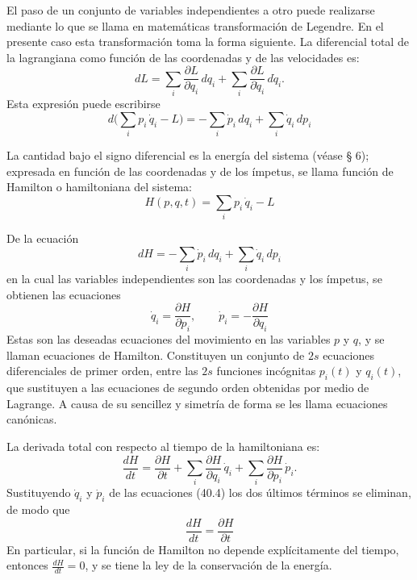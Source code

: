 \documentclass[12pt]{article}
\begin{document}
El paso de un conjunto de variables independientes a otro puede realizarse mediante lo que se llama en matemáticas transformación de Legendre. En el presente caso esta transformación toma la forma siguiente. La diferencial total de la lagrangiana como función de las coordenadas y de las velocidades es:
\[
dL
= \sum_i \frac{\partial L}{\partial q_i}\,dq_i
+ \sum_i \frac{\partial L}{\partial \dot q_i}\,d\dot q_i.
\]
Esta expresión puede escribirse
\begin{equation}
d\biggl(\sum_i p_i\,\dot q_i - L\biggr)
= -\sum_i \dot p_i\,dq_i
+ \sum_i \dot q_i\,dp_i
\tag{40.1}
\end{equation}

La cantidad bajo el signo diferencial es la energía del sistema (véase § 6); expresada en función de las coordenadas y de los ímpetus, se llama función de Hamilton o hamiltoniana del sistema:
\begin{equation}
H(p,q,t)
= \sum_i p_i\,\dot q_i - L
\tag{40.2}
\end{equation}

De la ecuación
\begin{equation}
dH
= -\sum_i \dot p_i\,dq_i
+ \sum_i \dot q_i\,dp_i
\tag{40.3}
\end{equation}
en la cual las variables independientes son las coordenadas y los ímpetus, se obtienen las ecuaciones
\begin{equation}
\dot q_i = \frac{\partial H}{\partial p_i},
\qquad
\dot p_i = -\frac{\partial H}{\partial q_i}
\tag{40.4}
\end{equation}
Estas son las deseadas ecuaciones del movimiento en las variables \(p\) y \(q\), y se llaman ecuaciones de Hamilton. Constituyen un conjunto de \(2s\) ecuaciones diferenciales de primer orden, entre las \(2s\) funciones incógnitas \(p_i(t)\) y \(q_i(t)\), que sustituyen a las ecuaciones de segundo orden obtenidas por medio de Lagrange. A causa de su sencillez y simetría de forma se les llama ecuaciones canónicas.

La derivada total con respecto al tiempo de la hamiltoniana es:
\[
\frac{dH}{dt}
= \frac{\partial H}{\partial t}
+ \sum_i \frac{\partial H}{\partial q_i}\,\dot q_i
+ \sum_i \frac{\partial H}{\partial p_i}\,\dot p_i.
\]
Sustituyendo \(\dot q_i\) y \(\dot p_i\) de las ecuaciones (40.4) los dos últimos términos se eliminan, de modo que
\begin{equation}
\frac{dH}{dt}
= \frac{\partial H}{\partial t}
\tag{40.5}
\end{equation}
En particular, si la función de Hamilton no depende explícitamente del tiempo, entonces \(\tfrac{dH}{dt}=0\), y se tiene la ley de la conservación de la energía.
\end{document}
